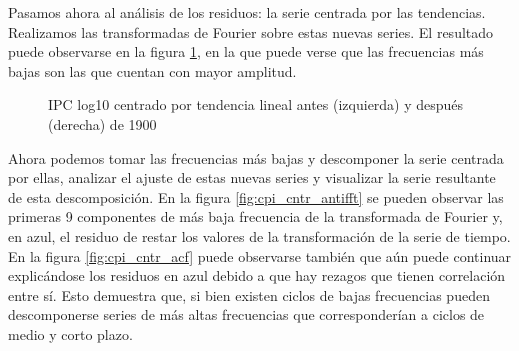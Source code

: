 \documentclass[a4paper]{article}
\begin{document}
Pasamos ahora al análisis de los residuos: la serie centrada por las tendencias. Realizamos las transformadas de Fourier sobre estas nuevas series. El resultado puede observarse en la figura \ref{fig:cpi_log10_cntr_fft}, en la que puede verse que las frecuencias más bajas son las que cuentan con mayor amplitud.

\begin{figure}[H]
	\centering
	\caption{IPC log10 centrado por tendencia lineal antes (izquierda) y después (derecha) de 1900} 	
	\label{fig:cpi_log10_cntr_fft}
\end{figure}

Ahora podemos tomar las frecuencias más bajas y descomponer la serie centrada por ellas, analizar el ajuste de estas nuevas series y visualizar la serie resultante de esta descomposición. En la figura \ref{fig:cpi_cntr_antifft} se pueden observar las primeras 9 componentes de más baja frecuencia de la transformada de Fourier y, en azul, el residuo de restar los valores de la transformación de la serie de tiempo. En la figura \ref{fig:cpi_cntr_acf} puede observarse también que aún puede continuar explicándose los residuos en azul debido a que hay rezagos que tienen correlación entre sí. Esto demuestra que, si bien existen ciclos de bajas frecuencias pueden descomponerse series de más altas frecuencias que corresponderían a ciclos de medio y corto plazo.
\end{document}
